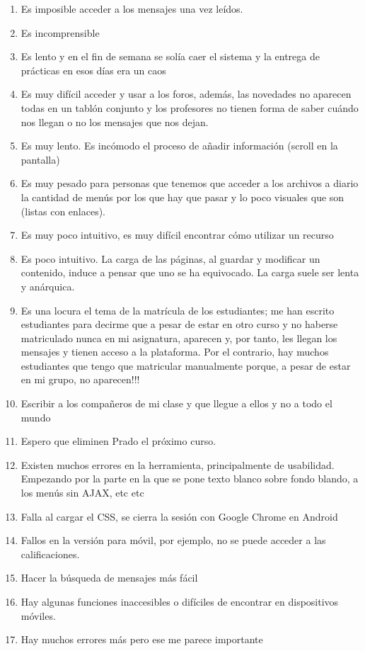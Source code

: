 \begin{enumerate}
\item Es imposible acceder a los mensajes una vez leídos.
\item Es incomprensible
\item Es lento y en el fin de semana se solía caer el sistema y la entrega de prácticas en esos días era un caos
\item Es muy difícil acceder y usar a los foros, además, las novedades no aparecen todas en un tablón conjunto y los profesores no tienen forma de saber cuándo nos llegan o no los mensajes que nos dejan.
\item Es muy lento. Es incómodo el proceso de añadir información (scroll en la pantalla)
\item Es muy pesado para personas que tenemos que acceder a los archivos a diario la cantidad de menús por los que hay que pasar y lo poco visuales que son (listas con enlaces).
\item Es muy poco intuitivo, es muy difícil encontrar cómo utilizar un recurso
\item Es poco intuitivo. La carga de las páginas, al guardar y modificar un contenido, induce a pensar que uno se ha equivocado. La carga suele ser lenta y anárquica.
\item Es una locura el tema de la matrícula de los estudiantes; me han escrito estudiantes para decirme que a pesar de estar en otro curso y no haberse matriculado nunca en mi asignatura, aparecen y, por tanto, les llegan los mensajes y tienen acceso a la plataforma. Por el contrario, hay muchos estudiantes que tengo que matricular manualmente porque, a pesar de estar en mi grupo, no aparecen!!!
\item Escribir a los compañeros de mi clase y que llegue a ellos y no a todo el mundo
\item Espero que eliminen Prado el próximo curso.
\item Existen muchos errores en la herramienta, principalmente de usabilidad. Empezando por la parte en la que se pone texto blanco sobre fondo blando, a los menús sin AJAX, etc etc
\item Falla al cargar el CSS, se cierra la sesión con Google Chrome en Android
\item Fallos en la versión para móvil, por ejemplo, no se puede acceder a las calificaciones.
\item Hacer la búsqueda de mensajes más fácil
\item Hay algunas funciones inaccesibles o difíciles de encontrar en dispositivos móviles.
\item Hay muchos errores más pero ese me parece importante

\end{enumerate}
